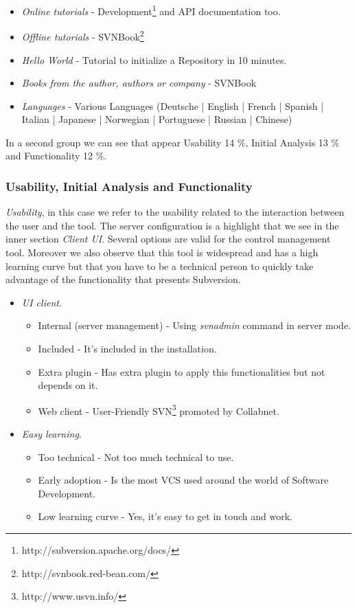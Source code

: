 \documentclass[11pt]{scrartcl}
\begin{document}
\begin{itemize}
    \item \emph{Online tutorials} - Development\footnote{http://subversion.apache.org/docs/} and API documentation too.
    \item \emph{Offline tutorials} - SVNBook\footnote{http://svnbook.red-bean.com/}
    \item \emph{Hello World} - Tutorial to initialize a Repository in 10 minutes.
    \item \emph{Books from the author, authors or company} -  SVNBook
    \item \emph{Languages} - Various Languages (Deutsche | English | French | Spanish | Italian | Japanese | Norwegian | Portuguese | Russian | Chinese)
\end{itemize}

\par In a second group we can see that appear Usability 14 \%, Initial Analysis 13 \% and Functionality 12 \%.

\subsubsection{Usability, Initial Analysis and Functionality}

\par \emph{Usability}, in this case we refer to the usability related to the interaction between the user and the tool. The server configuration is a highlight that we see in the inner section \emph{Client UI}. Several options are valid for the control management tool. Moreover we also observe that this tool is widespread and has a high learning curve but that you have to be a technical person to quickly take advantage of the functionality that presents Subversion.

\begin{itemize}
    \item \emph{UI client}.
	    \begin{itemize}
            \item Internal (server management) - Using \emph{svnadmin} command in server mode.
            \item Included - It's included in the installation.
            \item Extra plugin - Has extra plugin to apply this functionalities but not depends on it.
            \item Web client - User-Friendly SVN\footnote{http://www.usvn.info/} promoted by Collabnet.
        \end{itemize}

    \item \emph{Easy learning}.
	    \begin{itemize}
            \item Too technical - Not too much technical to use.
            \item Early adoption - Is the most VCS used around the world of Software Development.
            \item Low learning curve - Yes, it's easy to get in touch and work.
        \end{itemize}
\end{itemize}
\end{document}
